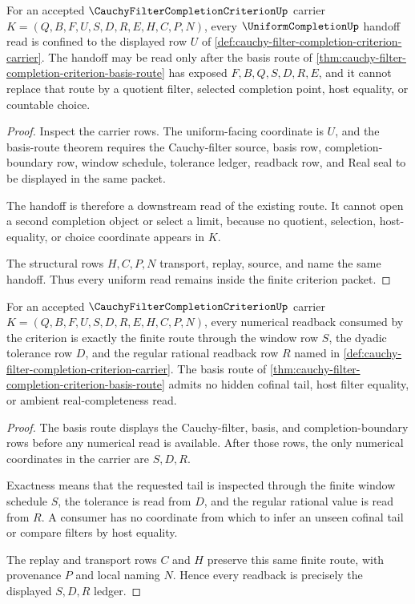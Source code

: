 \begin{theorem}
\label{thm:cauchy-filter-completion-criterion-uniform-handoff-nonescape}
For an accepted $\CauchyFilterCompletionCriterionUp$ carrier
$K=(Q,B,F,U,S,D,R,E,H,C,P,N)$, every $\UniformCompletionUp$ handoff read is
confined to the displayed row $U$ of
\autoref{def:cauchy-filter-completion-criterion-carrier}. The handoff may be
read only after the basis route of
\autoref{thm:cauchy-filter-completion-criterion-basis-route} has exposed
$F,B,Q,S,D,R,E$, and it cannot replace that route by a quotient filter,
selected completion point, host equality, or countable choice.
\end{theorem}
\begin{proof}
Inspect the carrier rows. The uniform-facing coordinate is $U$, and the
basis-route theorem requires the Cauchy-filter source, basis row,
completion-boundary row, window schedule, tolerance ledger, readback row, and
Real seal to be displayed in the same packet.

The handoff is therefore a downstream read of the existing route. It cannot
open a second completion object or select a limit, because no quotient,
selection, host-equality, or choice coordinate appears in $K$.

The structural rows $H,C,P,N$ transport, replay, source, and name the same
handoff. Thus every uniform read remains inside the finite criterion packet.
\end{proof}

\begin{theorem}
\label{thm:cauchy-filter-completion-criterion-readback-exactness}
For an accepted $\CauchyFilterCompletionCriterionUp$ carrier
$K=(Q,B,F,U,S,D,R,E,H,C,P,N)$, every numerical readback consumed by the
criterion is exactly the finite route through the window row $S$, the dyadic
tolerance row $D$, and the regular rational readback row $R$ named in
\autoref{def:cauchy-filter-completion-criterion-carrier}. The basis route of
\autoref{thm:cauchy-filter-completion-criterion-basis-route} admits no hidden
cofinal tail, host filter equality, or ambient real-completeness read.
\end{theorem}
\begin{proof}
The basis route displays the Cauchy-filter, basis, and completion-boundary
rows before any numerical read is available. After those rows, the only
numerical coordinates in the carrier are $S,D,R$.

Exactness means that the requested tail is inspected through the finite
window schedule $S$, the tolerance is read from $D$, and the regular rational
value is read from $R$. A consumer has no coordinate from which to infer an
unseen cofinal tail or compare filters by host equality.

The replay and transport rows $C$ and $H$ preserve this same finite route,
with provenance $P$ and local naming $N$. Hence every readback is precisely
the displayed $S,D,R$ ledger.
\end{proof}


